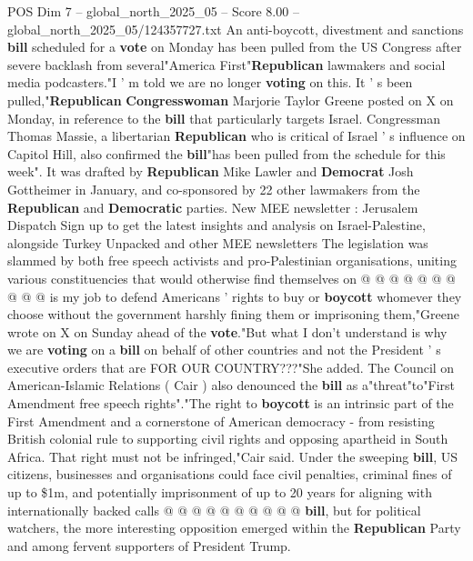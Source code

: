 \begin{textsample}{POS Dim 7 – global\_north\_2025\_05 – Score 8.00 – global\_north\_2025\_05/124357727.txt}  \label{ex:f7_pos_327}
An anti-boycott, divestment and sanctions \textbf{bill} scheduled for a \textbf{vote} on Monday has been pulled from the US Congress after severe backlash from several"America First"\textbf{Republican} lawmakers and social media podcasters."I ' m told we are no longer \textbf{voting} on this.
It ' s been pulled,"\textbf{Republican} \textbf{Congresswoman} Marjorie Taylor Greene posted on X on Monday, in reference to the \textbf{bill} that particularly targets Israel.
Congressman Thomas Massie, a libertarian \textbf{Republican} who is critical of Israel ' s influence on Capitol Hill, also confirmed the \textbf{bill}"has been pulled from the schedule for this week".
It was drafted by \textbf{Republican} Mike Lawler and \textbf{Democrat} Josh Gottheimer in January, and co-sponsored by 22 other lawmakers from the \textbf{Republican} and \textbf{Democratic} parties.
New MEE newsletter : Jerusalem Dispatch Sign up to get the latest insights and analysis on Israel-Palestine, alongside Turkey Unpacked and other MEE newsletters The legislation was slammed by both free speech activists and pro-Palestinian organisations, uniting various constituencies that would otherwise find themselves on @ @ @ @ @ @ @ @ @ @ is my job to defend Americans ' rights to buy or \textbf{boycott} whomever they choose without the government harshly fining them or imprisoning them,"Greene wrote on X on Sunday ahead of the \textbf{vote}."But what I don't understand is why we are \textbf{voting} on a \textbf{bill} on behalf of other countries and not the President ' s executive orders that are FOR OUR COUNTRY???"She added.
The Council on American-Islamic Relations ( Cair ) also denounced the \textbf{bill} as a"threat"to"First Amendment free speech rights"."The right to \textbf{boycott} is an intrinsic part of the First Amendment and a cornerstone of American democracy - from resisting British colonial rule to supporting civil rights and opposing apartheid in South Africa.
That right must not be infringed,"Cair said.
Under the sweeping \textbf{bill}, US citizens, businesses and organisations could face civil penalties, criminal fines of up to \$1m, and potentially imprisonment of up to 20 years for aligning with internationally backed calls @ @ @ @ @ @ @ @ @ @ \textbf{bill}, but for political watchers, the more interesting opposition emerged within the \textbf{Republican} Party and among fervent supporters of President Trump.

\end{textsample}
